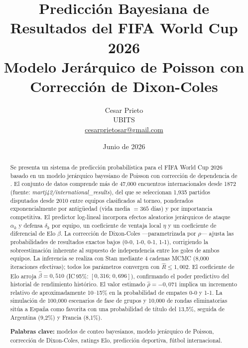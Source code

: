\documentclass[12pt,a4paper]{article}
\begin{document}
\title{%
  \textbf{Predicción Bayesiana de Resultados del FIFA World Cup 2026}\\[6pt]
  \large Modelo Jerárquico de Poisson con Corrección de Dixon-Coles
}
\author{%
  Cesar Prieto\\[4pt]
  \normalsize UBITS\\
  \normalsize \href{mailto:cesarprietosar@gmail.com}{cesarprietosar@gmail.com}
}
\date{Junio de 2026}

\maketitle
\thispagestyle{empty}

\begin{abstract}
\noindent
Se presenta un sistema de predicción probabilística para el FIFA World Cup 2026
basado en un modelo jerárquico bayesiano de Poisson con corrección de dependencia
de \citet{dixon1997modelling}.
El conjunto de datos comprende más de 47{,}000 encuentros internacionales desde 1872
(fuente: \textit{martj42/international\_results}), del que se seleccionan
1{,}935 partidos disputados desde 2010 entre equipos clasificados al torneo,
ponderados exponencialmente por antigüedad (vida media $= 365$ días) y por
importancia competitiva.
El predictor log-lineal incorpora efectos aleatorios jerárquicos de ataque $\alpha_k$
y defensa $\delta_k$ por equipo, un coeficiente de ventaja local $\eta$ y un
coeficiente de diferencial de Elo $\beta$.
La corrección de Dixon-Coles —parametrizada por $\rho$— ajusta las probabilidades
de resultados exactos bajos (0-0, 1-0, 0-1, 1-1), corrigiendo la sobreestimación
inherente al supuesto de independencia entre los goles de ambos equipos.
La inferencia se realiza con Stan mediante 4 cadenas MCMC (8{,}000 iteraciones
efectivas); todos los parámetros convergen con $\hat{R} \leq 1{,}002$.
El coeficiente de Elo arroja $\hat{\beta} = 0{,}510$
(IC\,95\%: $[0{,}316;\, 0{,}696]$), confirmando el poder predictivo del historial
de rendimiento histórico.
El valor estimado $\hat{\rho} = -0{,}071$ implica un incremento relativo de
aproximadamente 10--15\% en la probabilidad de empates 0-0 y 1-1.
La simulación de 100{,}000 escenarios de fase de grupos y 10{,}000 de rondas
eliminatorias sitúa a España como favorita con una probabilidad de título del
13{,}5\%, seguida de Argentina (9{,}2\%) y Francia (8{,}1\%).

\bigskip
\noindent\textbf{Palabras clave:} modelos de conteo bayesianos,
modelo jerárquico de Poisson, corrección de Dixon-Coles,
ratings Elo, predicción deportiva, fútbol internacional.
\end{abstract}
\end{document}
